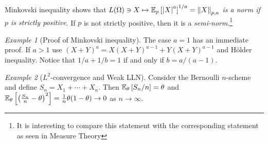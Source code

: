 \documentclass[12pt,a4paper]{amsart}
\theoremstyle{plain}%
\theoremstyle{definition}
\theoremstyle{remark}
\newtheorem{example}{Example}
\begin{document}
Minkovski inequality shows that \emph{$L(\Omega) \ni X \mapsto \expectat p {\aval X ^ a} ^{1/a} = \normat {p,a} X$ is a \emph{norm} if $p$ is strictly positive}. If $p$ is not strictly positive, then it is a \emph{semi-norm}.\footnote{It is interesting to compare this statement with the corresponding statement as seen in Measure Theory}

\begin{example}[Proof of Minkovski inequality]
The case $a=1$ has an immediate proof. If $a > 1$ use $(X+Y)^a = X(X+Y)^{a-1} + Y(X+Y)^{a-1}$ and H\"older inequality. Notice that $1/a+1/b=1$ if and only if $b = a/(a-1)$.  
\end{example}

\begin{example}[$L^2$-convergence and Weak LLN] Consider the Bernoulli $n$-scheme and define $S_n=X_1+\cdots+X_n$. Then $\expectat \theta {S_n/n} = \theta$ and $\expectat \theta {\left(\frac {S_n}n - \theta\right)^2} = \frac1n \theta(1-\theta) \to 0$ as $n \to \infty$.
\end{example}
\end{document}
